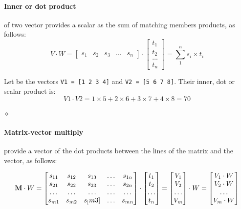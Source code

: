 \paragraph{Inner or dot product} of two vector provides a scalar as the sum of matching members products, as follows:
\[
V \cdot W = \begin{bmatrix}
    s_{1} & s_{2} & s_{3} & \ldots & s_{n} 
    \end{bmatrix}
    \cdot
    \begin{bmatrix}
    t_{1} \\
    t_{2} \\
    \ldots \\
    t_{n} 
    \end{bmatrix}
    = \sum_{1}^{n} s_i \times t_i
\]



\begin{exemplu} Let be the vectors {\tt V1 = [1 2 3 4]} and {\tt V2 = [5 6 7 8]}. Their inner, dot or scalar product is: $$V1 \cdot V2 = 1 \times 5 + 2 \times 6 + 3 \times 7 + 4 \times 8 = 70$$

$\diamond$
\end{exemplu}

\paragraph{Matrix-vector multiply} provide a vector of the dot products between the lines of the matrix and the vector, as follows:

\[
{\bf M} \cdot W = \begin{bmatrix}
    s_{11} & s_{12} & s_{13} & \ldots & s_{1n} \\
    s_{21} & s_{22} & s_{23} & \ldots & s_{2n} \\
    \ldots & \ldots & \ldots & \ldots & \ldots \\
    s_{m1} & s_{m2} & s_[m3] & \dots  & s_{mn}
    \end{bmatrix}
    \cdot
    \begin{bmatrix}
    t_{1} \\
    t_{2} \\
    \ldots \\
    t_{n} 
    \end{bmatrix}
    = 
    \begin{bmatrix}
    V_{1} \\
    V_{2} \\
    \ldots \\
    V_{m} 
    \end{bmatrix}
    \cdot W
    = 
    \begin{bmatrix}
    V_{1} \cdot W \\
    V_{2} \cdot W \\
    \ldots \\
    V_{m} \cdot W
    \end{bmatrix}
\]


